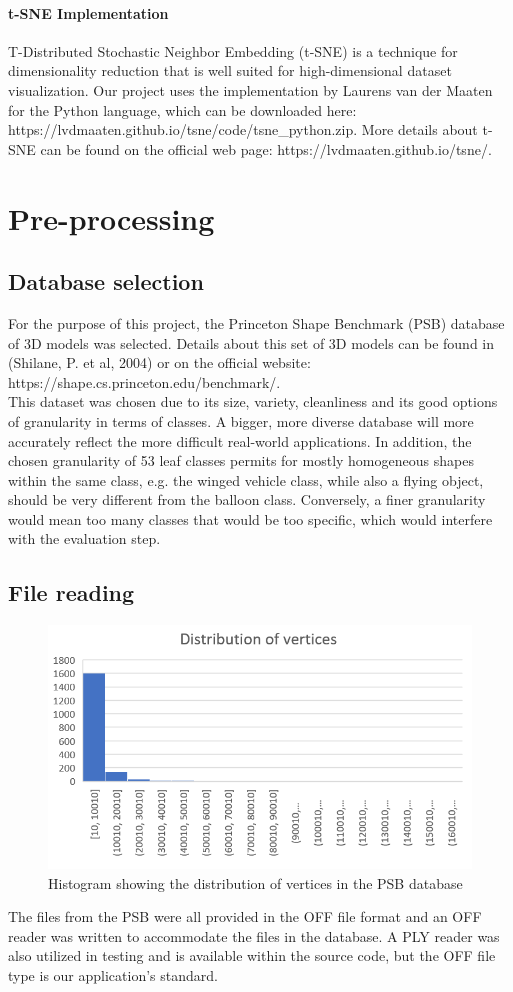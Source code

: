 \documentclass{bigdata}
\begin{document}
\paragraph{t-SNE Implementation}
T-Distributed Stochastic Neighbor Embedding (t-SNE) is a technique for dimensionality reduction that is well suited for high-dimensional dataset visualization. Our project uses the implementation by Laurens van der Maaten for the Python language, which can be downloaded here: https://lvdmaaten.github.io/tsne/code/tsne\_python.zip. More details about t-SNE can be found on the official web page: https://lvdmaaten.github.io/tsne/.

\section{Pre-processing}

\subsection{Database selection}
For the purpose of this project, the Princeton Shape Benchmark (PSB) database of 3D models was selected. Details about this set of 3D models can be found in (Shilane, P. et al, 2004) or on the official website: https://shape.cs.princeton.edu/benchmark/. \\
This dataset was chosen due to its size, variety, cleanliness and its good options of granularity in terms of classes. A bigger, more diverse database will more accurately reflect the more difficult real-world applications. In addition, the chosen granularity of 53 leaf classes permits for mostly homogeneous shapes within the same class, e.g. the winged vehicle class, while also a flying object, should be very different from the balloon class. Conversely, a finer granularity would mean too many classes that would be too specific, which would interfere with the evaluation step. 

\subsection{File reading}
\begin{figure}[b!]
	\centering
	\includegraphics[width=0.7\linewidth]{Pictures/verticesHist.png}
	\caption{Histogram showing the distribution of vertices in the PSB database}
\end{figure}
The files from the PSB were all provided in the OFF file format and an OFF reader was written to accommodate the files in the database. A PLY reader was also utilized in testing and is available within the source code, but the OFF file type is our application's standard.
\end{document}
